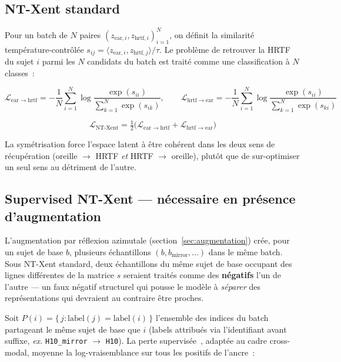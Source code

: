 \documentclass[12pt, a4paper]{article}
\begin{document}
\subsection{NT-Xent standard}

Pour un batch de $N$ paires $(z_{\mathrm{ear},i}, z_{\mathrm{hrtf},i})_{i=1}^N$,
on définit la similarité température-contrôlée
$s_{ij} = \langle z_{\mathrm{ear},i}, z_{\mathrm{hrtf},j}\rangle / \tau$.
Le problème de retrouver la HRTF du sujet $i$ parmi les $N$ candidats du
batch est traité comme une classification à $N$ classes~:

\begin{equation}
    \mathcal{L}_{\mathrm{ear}\to\mathrm{hrtf}}
    = -\frac{1}{N}\sum_{i=1}^{N} \log
    \frac{\exp(s_{ii})}{\sum_{k=1}^N \exp(s_{ik})},
    \qquad
    \mathcal{L}_{\mathrm{hrtf}\to\mathrm{ear}}
    = -\frac{1}{N}\sum_{i=1}^{N} \log
    \frac{\exp(s_{ii})}{\sum_{k=1}^N \exp(s_{ki})}
\end{equation}

\begin{equation}
    \boxed{\;\mathcal{L}_{\mathrm{NT\text{-}Xent}}
    = \tfrac{1}{2}\bigl(\mathcal{L}_{\mathrm{ear}\to\mathrm{hrtf}}
    + \mathcal{L}_{\mathrm{hrtf}\to\mathrm{ear}}\bigr)\;}
\end{equation}

La symétrisation force l'espace latent à être cohérent dans les deux sens
de récupération (oreille $\to$ HRTF \emph{et} HRTF $\to$ oreille), plutôt
que de sur-optimiser un seul sens au détriment de l'autre.

\subsection{Supervised NT-Xent — nécessaire en présence d'augmentation}

L'augmentation par réflexion azimutale (section~\ref{sec:augmentation})
crée, pour un sujet de base $b$, plusieurs échantillons
$(b, b_{\mathrm{mirror}}, \dots)$ dans le même batch. Sous NT-Xent
standard, deux échantillons du même sujet de base occupant des lignes
différentes de la matrice $s$ seraient traités comme des \textbf{négatifs}
l'un de l'autre — un faux négatif structurel qui pousse le modèle à
\emph{séparer} des représentations qui devraient au contraire être
proches.

Soit $P(i) = \{\,j : \mathrm{label}(j) = \mathrm{label}(i)\,\}$ l'ensemble
des indices du batch partageant le même sujet de base que $i$ (labels
attribués via l'identifiant avant suffixe, \emph{ex.} \texttt{H10\_mirror}
$\to$ \texttt{H10}). La perte supervisée~\cite{Khosla20}, adaptée au cadre
cross-modal, moyenne la log-vraisemblance sur tous les positifs de
l'ancre~:
\end{document}
